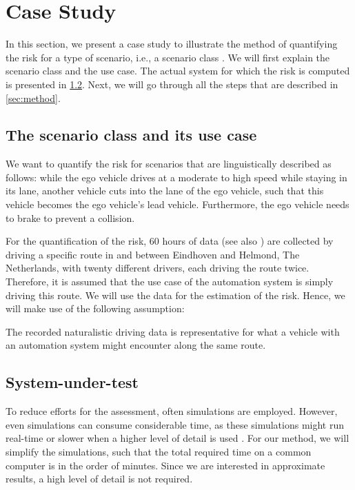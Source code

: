 \section{Case Study} %
\label{sec:example}

In this section, we present a case study to illustrate the method of quantifying the risk for a type of scenario, i.e., a scenario class \cite{elrofai2018scenario}. We will first explain the scenario class and the use case. The actual system for which the risk is computed is presented in \cref{sec:system}. Next, we will go through all the steps that are described in \cref{sec:method}.



\subsection{The scenario class and its use case}
\label{sec:scenario class}

We want to quantify the risk for scenarios that are linguistically described as follows: while the ego vehicle drives at a moderate to high speed while staying in its lane, another vehicle cuts into the lane of the ego vehicle, such that this vehicle becomes the ego vehicle's lead vehicle. Furthermore, the ego vehicle needs to brake to prevent a collision.

For the quantification of the risk, 60 hours of data (see also \cite{deGelder2017assessment}) are collected by driving a specific route in and between Eindhoven and Helmond, The Netherlands, with twenty different drivers, each driving the route twice. Therefore, it is assumed that the use case of the automation system is simply driving this route. We will use the data for the estimation of the risk. Hence, we will make use of the following assumption:
\begin{assumption}
	The recorded naturalistic driving data is representative for what a vehicle with an automation system might encounter along the same route.
\end{assumption}



\subsection{System-under-test}
\label{sec:system}

To reduce efforts for the assessment, often simulations are employed. However, even simulations can consume considerable time, as these simulations might run real-time \cite{shah2018airsim} or slower when a higher level of detail is used \cite{zofka2016testing}. For our method, we will simplify the simulations, such that the total required time on a common computer is in the order of minutes. Since we are interested in approximate results, a high level of detail is not required. 

